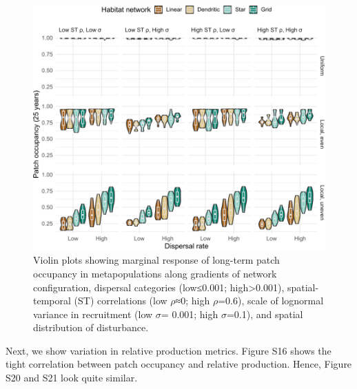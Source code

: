 \documentclass[
]{article}
\begin{document}
\begin{figure}[H]

{\centering \includegraphics{Managing_for_ecological_surprises_in_metapopulations_files/figure-latex/violin plots of risk of patch occupancy-1} 

}

\caption{Violin plots showing marginal response of long-term patch occupancy in metapopulations along gradients of network configuration, dispersal categories (low≤0.001; high>0.001), spatial-temporal (ST) correlations (low $\rho$≈0; high $\rho$=0.6), scale of lognormal variance in recruitment (low $\sigma$= 0.001; high $\sigma$=0.1), and spatial distribution of disturbance.}\label{fig:violin plots of risk of patch occupancy}
\end{figure}

Next, we show variation in relative production metrics. Figure S16 shows
the tight correlation between patch occupancy and relative production.
Hence, Figure S20 and S21 look quite similar.
\end{document}
